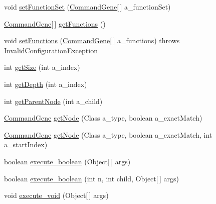 \begin{DoxyCompactItemize}
\item 
void \hyperlink{classorg_1_1jgap_1_1gp_1_1impl_1_1_program_chromosome_a81171ec1774c2605dc2080c476768f19}{set\-Function\-Set} (\hyperlink{classorg_1_1jgap_1_1gp_1_1_command_gene}{Command\-Gene}\mbox{[}$\,$\mbox{]} a\-\_\-function\-Set)
\item 
\hyperlink{classorg_1_1jgap_1_1gp_1_1_command_gene}{Command\-Gene}\mbox{[}$\,$\mbox{]} \hyperlink{classorg_1_1jgap_1_1gp_1_1impl_1_1_program_chromosome_a9814ee68c4893d979b6d6c702f754ed6}{get\-Functions} ()
\item 
void \hyperlink{classorg_1_1jgap_1_1gp_1_1impl_1_1_program_chromosome_a9b47c5e0e01b774eed4f0be74a94764e}{set\-Functions} (\hyperlink{classorg_1_1jgap_1_1gp_1_1_command_gene}{Command\-Gene}\mbox{[}$\,$\mbox{]} a\-\_\-functions)  throws Invalid\-Configuration\-Exception 
\item 
int \hyperlink{classorg_1_1jgap_1_1gp_1_1impl_1_1_program_chromosome_a14b7aa6ec69495ad519f64dbc362488e}{get\-Size} (int a\-\_\-index)
\item 
int \hyperlink{classorg_1_1jgap_1_1gp_1_1impl_1_1_program_chromosome_ac6c8388003452adf7ebd2b0e70c916ac}{get\-Depth} (int a\-\_\-index)
\item 
int \hyperlink{classorg_1_1jgap_1_1gp_1_1impl_1_1_program_chromosome_a94c73ab9b25ed666e4fabe83e70dd8c4}{get\-Parent\-Node} (int a\-\_\-child)
\item 
\hyperlink{classorg_1_1jgap_1_1gp_1_1_command_gene}{Command\-Gene} \hyperlink{classorg_1_1jgap_1_1gp_1_1impl_1_1_program_chromosome_a9dcb6045fafdd72b8241f3f1634ec433}{get\-Node} (Class a\-\_\-type, boolean a\-\_\-exact\-Match)
\item 
\hyperlink{classorg_1_1jgap_1_1gp_1_1_command_gene}{Command\-Gene} \hyperlink{classorg_1_1jgap_1_1gp_1_1impl_1_1_program_chromosome_a2e3b39bebbe5a3f6bb46494341d8d39d}{get\-Node} (Class a\-\_\-type, boolean a\-\_\-exact\-Match, int a\-\_\-start\-Index)
\item 
boolean \hyperlink{classorg_1_1jgap_1_1gp_1_1impl_1_1_program_chromosome_ac02462405fa19e5b91d8b7c99f91c872}{execute\-\_\-boolean} (Object\mbox{[}$\,$\mbox{]} args)
\item 
boolean \hyperlink{classorg_1_1jgap_1_1gp_1_1impl_1_1_program_chromosome_a500cdb04cca5286bb9e10d41abba324f}{execute\-\_\-boolean} (int n, int child, Object\mbox{[}$\,$\mbox{]} args)
\item 
void \hyperlink{classorg_1_1jgap_1_1gp_1_1impl_1_1_program_chromosome_aa493171a9ea6d5a0973337d5394cf973}{execute\-\_\-void} (Object\mbox{[}$\,$\mbox{]} args)

\end{DoxyCompactItemize}
